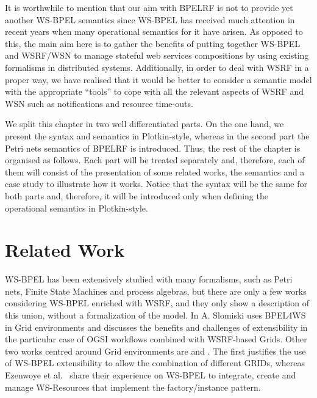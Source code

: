 It is worthwhile to mention that our aim with BPELRF is not to provide yet another WS-BPEL semantics since WS-BPEL has received much attention in recent years when many operational semantics for it have arisen. As opposed to this, the main aim here is to gather the benefits of putting together WS-BPEL and WSRF/WSN to manage stateful web services compositions by using existing formalisms in distributed systems. Additionally, in order to deal with WSRF in a proper way, we have realised that it would be better to consider a semantic model with the appropriate ``tools'' to cope with all the relevant aspects of WSRF and WSN such as notifications and resource time-outs. %

We split this chapter in two well differentiated parts. On the one hand, we present the syntax and semantics in Plotkin-style, whereas in the second part the Petri nets semantics of BPELRF is introduced. Thus, the rest of the chapter is organised as follows. Each part will be treated separately and, therefore, each of them will consist of the presentation of some related works, the semantics and a case study to illustrate how it works. Notice that the syntax will be the same for both parts and, therefore, it will be introduced only when defining the operational semantics in Plotkin-style.

\section*{Related Work}\label{rWork}
WS-BPEL has been extensively studied with many formalisms, such as
Petri nets, Finite State Machines and process algebras, but 
there are only a few works considering WS-BPEL enriched with 
WSRF, and they only show a description of this union, 
without a formalization of the model.
In \cite{Slomiski06} A. Slomiski uses BPEL4WS in Grid environments and discusses the
benefits and challenges of extensibility in the particular case of OGSI workflows
combined with WSRF-based Grids. Other two works centred around Grid environments are 
\cite{Leymann06} and \cite{Ezenwoye07}. The first justifies 
the use of WS-BPEL extensibility to allow the combination of different GRIDs, whereas
Ezenwoye et al.~\cite{Ezenwoye07} share their experience on WS-BPEL to integrate,
create and manage WS-Resources that implement the factory/instance pattern.


